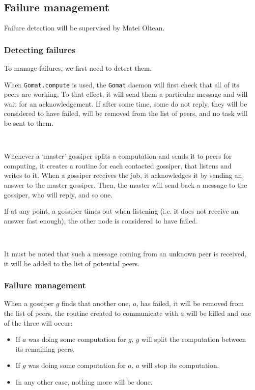 \documentclass[a4paper,12pt]{article}
\newcommand{\Gomat}{\texttt{Gomat}\xspace}
\begin{document}
        \subsection{Failure management}
        Failure detection will be supervised by Matei Oltean.

        \subsubsection{Detecting failures}
    To manage failures, we first need to detect them.

    When \texttt{Gomat.compute} is used, the \Gomat daemon will first check that all of its peers are working. To that effect, it will send them a particular message and will wait for an acknowledgement. If after some time, some do not reply, they will be considered to have failed, will be removed from the list of peers, and no task will be sent to them.

~~

    Whenever a ‘master’ gossiper splits a computation and sends it to peers for computing, it creates a routine for each contacted gossiper, that listens and writes to it.
When a gossiper receives the job, it acknowledges it by sending an answer to the master gossiper.
Then, the master will send back a message to the gossiper, who will reply, and so one.

    If at any point, a gossiper times out when listening (i.e. it does not receive an answer fast enough), the other node is considered to have failed.

~~

    It must be noted that such a message coming from an unknown peer is received, it will be added to the list of potential peers.

    \subsubsection{Failure management}
    When a gossiper $g$ finds that another one, $a$, has failed, it will be removed from the list of peers, the routine created to communicate with $a$ will be killed and one of the three will occur:

\begin{itemize}
\item If $a$ was doing some computation for $g$, $g$ will split the computation between its remaining peers.
\item If $g$ was doing some computation for $a$, $a$ will stop its computation.
\item In any other case, nothing more will be done.
\end{itemize}
\end{document}
